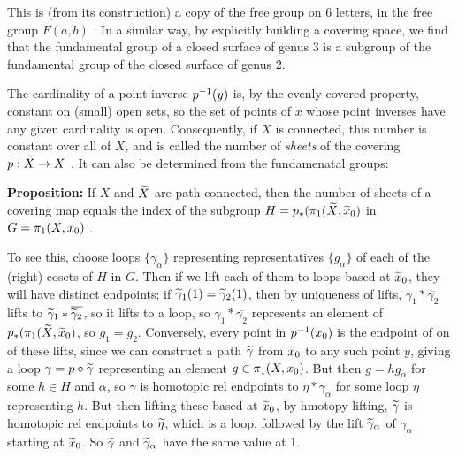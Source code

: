\msk


\msk

\leavevmode


\epsfxsize=3in


\bsk

This is (from its construction) a copy of the free group on 6 letters,
in the free group $F(a,b)$ . In a similar way, by explicitly building
a covering space, we find that the fundamental group of a closed 
surface of genus 3 is a subgroup of the fundamental group of the 
closed surface of genus 2. 

\msk

The cardinality of a point inverse $p^{-1}(y)$ is, by the evenly
covered property, constant on (small) open sets, so the set of 
points of $x$ whose point inverses have any given cardinality
is open. Consequently, if $X$ is connected, this number
is constant over all of $X$, and is called the number of {\it sheets}
of the covering $p:\widetilde{X}\rightarrow X$ . It can also be determined 
from the fundamenatal groups:

\msk

{\bf Proposition:} If $X$ and $\widetilde{X}$ are 
path-connected, then the number of sheets of a covering map equals
the index of the subgroup $H=p_*(\pi_1(\widetilde{X},\widetilde{x}_0)$ in 
$G=\pi_1(X,x_0)$ . 

\msk

To see this, choose loops $\{\gamma_\alpha\}$ representing representatives $\{g_\alpha\}$ of each of the (right) cosets of $H$ in $G$. Then if we lift
each of them to loops based at $\widetilde{x}_0$, they will have distinct
endpoints; if $\widetilde{\gamma}_1(1)=\widetilde{\gamma}_2(1)$, then 
by uniqueness of lifts, $\gamma_1*\overline{\gamma_2}$ lifts to 
$\widetilde{\gamma}_1*\overline{\widetilde{\gamma}_2}$, so it
lifts to a loop, so $\gamma_1*\overline{\gamma_2}$ represents
an element of $p_*(\pi_1(\widetilde{X},\widetilde{x}_0)$, so $g_1=g_2$.
Conversely, every point in $p^{-1}(x_0)$ is the endpoint of on of these
lifts, since we can construct a path $\widetilde{\gamma}$
from $\widetilde{x}_0$ to any such point $y$, giving a loop
$\gamma=p\circ \widetilde{\gamma}$ representing an element $g\in\pi_1(X,x_0)$.
But then $g=hg_\alpha$ for some $h\in H$ and $\alpha$, 
so $\gamma$ is homotopic rel endpoints to $\eta*\gamma_\alpha$ for some loop
$\eta$ representing $h$. But then lifting these based at $\widetilde{x}_0$, by hmotopy
lifting, $\widetilde{\gamma}$ is homotopic rel endpoints to $\widetilde{\eta}$, which is a 
loop, followed by the lift $\widetilde{\gamma}_\alpha$ of $\gamma_\alpha$
starting at $\widetilde{x}_0$. So $\widetilde{\gamma}$ and 
$\widetilde{\gamma}_\alpha$ have the same value at 1.


